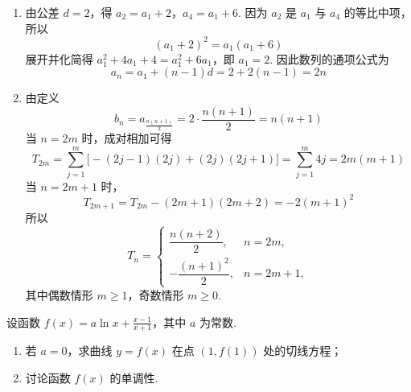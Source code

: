 \begin{solution}
\begin{enumerate}
\item 由公差 \(d=2\)，得
\(a_{2}=a_{1}+2\)，\(a_{4}=a_{1}+6\).
因为 \(a_{2}\) 是 \(a_{1}\) 与 \(a_{4}\) 的等比中项，所以
\[
(a_{1}+2)^{2}=a_{1}(a_{1}+6)
\]
展开并化简得 \(a_{1}^{2}+4a_{1}+4=a_{1}^{2}+6a_{1}\)，即 \(a_{1}=2\). 因此数列的通项公式为
\[
a_{n}=a_{1}+(n-1)d=2+2(n-1)=2n
\]

\item 由定义
\[
b_{n}=a_{\frac{n(n+1)}2}=2\cdot\frac{n(n+1)}2=n(n+1)
\]
当 \(n=2m\) 时，成对相加可得
\[
T_{2m}=\sum_{j=1}^{m}\bigl[-(2j-1)(2j)+(2j)(2j+1)\bigr]
=\sum_{j=1}^{m}4j=2m(m+1)
\]
当 \(n=2m+1\) 时，
\[
T_{2m+1}=T_{2m}-(2m+1)(2m+2)=-2(m+1)^{2}
\]
所以
\[
T_{n}=\begin{cases}
\dfrac{n(n+2)}2,&n=2m,\\[6pt]
-\dfrac{(n+1)^{2}}2,&n=2m+1,
\end{cases}
\]
其中偶数情形 \(m\geqslant1\)，奇数情形 \(m\geqslant0\).
\end{enumerate}
\end{solution}

\begin{problem}
设函数 \( f(x) = a \ln x + \frac{x - 1}{x + 1} \)，其中 \( a \) 为常数.

\begin{enumerate}
\item 若 \(a = 0\)，求曲线 \(y = f(x)\) 在点 \((1, f(1))\) 处的切线方程；
\item 讨论函数 \(f(x)\) 的单调性.
\end{enumerate}
\end{problem}

